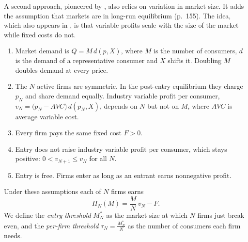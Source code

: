 A second approach, pioneered by \citet{BresnahanReiss1991}, also relies on variation in market size. It adds
the assumption that markets are in long-run equilibrium (p.~155). The idea, which also appears in
\citet{Sutton1991}, is that variable profits scale with the size of the market while fixed costs do not.

\begin{assumption}\label{ass:01-br}
\leavevmode
\begin{enumerate}[label=(\roman*)]
  \item Market demand is $Q = M\,d(p, X)$, where $M$ is the number of consumers, $d$ is the demand of a
        representative consumer and $X$ shifts it. Doubling $M$ doubles demand at every price.
  \item The $N$ active firms are symmetric. In the post-entry equilibrium they charge $p_N$ and share demand
        equally. Industry variable profit per consumer, $v_N = \big(p_N - AVC\big)\,d(p_N, X)$, depends on
        $N$ but not on $M$, where $AVC$ is average variable cost.
  \item Every firm pays the same fixed cost $F > 0$.
  \item Entry does not raise industry variable profit per consumer, which stays positive:
        $0 < v_{N+1} \le v_N$ for all $N$.
  \item Entry is free. Firms enter as long as an entrant earns nonnegative profit.
\end{enumerate}
\end{assumption}

Under these assumptions each of $N$ firms earns
\begin{equation}\label{eq:01-br-profit}
  \Pi_N(M) = \frac{M}{N}\,v_N - F .
\end{equation}
We define the \emph{entry threshold} $M_N^*$ as the market size at which $N$ firms just break even, and the
\emph{per-firm threshold} $\tau_N = \frac{M_N^*}{N}$ as the number of consumers each firm needs.

